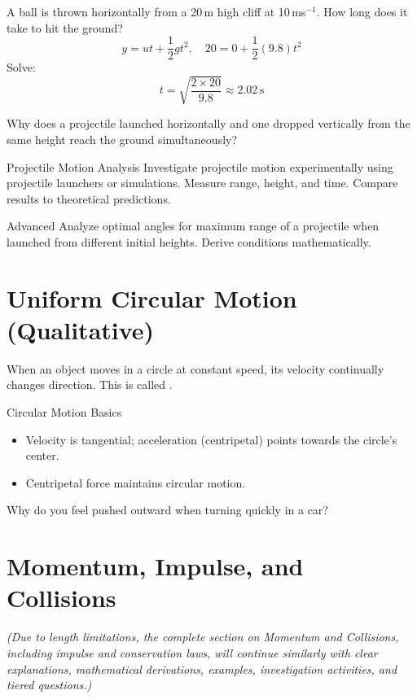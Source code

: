 \begin{example}
A ball is thrown horizontally from a 20\,m high cliff at 10\,ms$^{-1}$. How long does it take to hit the ground?
\[
y = ut + \frac{1}{2}gt^{2},\quad 20 = 0 + \frac{1}{2}(9.8)t^{2}
\]
Solve:
\[
t = \sqrt{\frac{2\times20}{9.8}} \approx 2.02\,\text{s}
\]
\end{example}

\begin{stopandthink}
Why does a projectile launched horizontally and one dropped vertically from the same height reach the ground simultaneously?
\end{stopandthink}

\begin{investigation}{Projectile Motion Analysis}
Investigate projectile motion experimentally using projectile launchers or simulations. Measure range, height, and time. Compare results to theoretical predictions.
\end{investigation}

\FloatBarrier

\begin{tieredquestions}{Advanced}
Analyze optimal angles for maximum range of a projectile when launched from different initial heights. Derive conditions mathematically.
\end{tieredquestions}

\section{Uniform Circular Motion (Qualitative)}
\FloatBarrier

When an object moves in a circle at constant speed, its velocity continually changes direction. This is called .

\begin{keyconcept}{Circular Motion Basics}
\begin{itemize}
    \item Velocity is tangential; acceleration (centripetal) points towards the circle’s center.
    \item Centripetal force maintains circular motion.
\end{itemize}
\end{keyconcept}

\begin{stopandthink}
Why do you feel pushed outward when turning quickly in a car?
\end{stopandthink}

\section{Momentum, Impulse, and Collisions}
\FloatBarrier

\textit{(Due to length limitations, the complete section on Momentum and Collisions, including impulse and conservation laws, will continue similarly with clear explanations, mathematical derivations, examples, investigation activities, and tiered questions.)}

\FloatBarrier